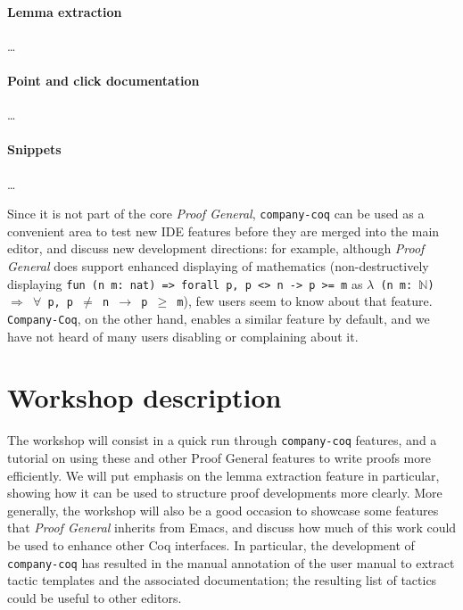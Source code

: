 \documentclass[preprint]{sigplanconf}
\begin{document}
\paragraph{Lemma extraction}  \ldots

\paragraph{Point and click documentation} \ldots

\paragraph{Snippets} \ldots

Since it is not part of the core \emph{Proof General}, \texttt{company-coq} can be used as a convenient area to test new IDE features before they are merged into the main editor, and discuss new development directions: for example, although \emph{Proof General} does support enhanced displaying of mathematics (non-destructively displaying \texttt{fun (n m: nat) => forall p, p <> n -> p >= m} as \texttt{$\lambda$ (n m: $\mathbb N$) $\Rightarrow$ $\forall$ p, p $\neq$ n $\rightarrow$ p $\geq$ m}), few users seem to know about that feature. \texttt{Company-Coq}, on the other hand, enables a similar feature by default, and we have not heard of many users disabling or complaining about it.

\section*{Workshop description}

The workshop will consist in a quick run through \texttt{company-coq} features, and a tutorial on using these and other Proof General features to write proofs more efficiently. We will put emphasis on the lemma extraction feature in particular, showing how it can be used to structure proof developments more clearly. More generally, the workshop will also be a good occasion to showcase some features that \emph{Proof General} inherits from Emacs, and discuss how much of this work could be used to enhance other Coq interfaces. In particular, the development of \texttt{company-coq} has resulted in the manual annotation of the user manual to extract tactic templates and the associated documentation; the resulting list of tactics could be useful to other editors.



\end{document}
